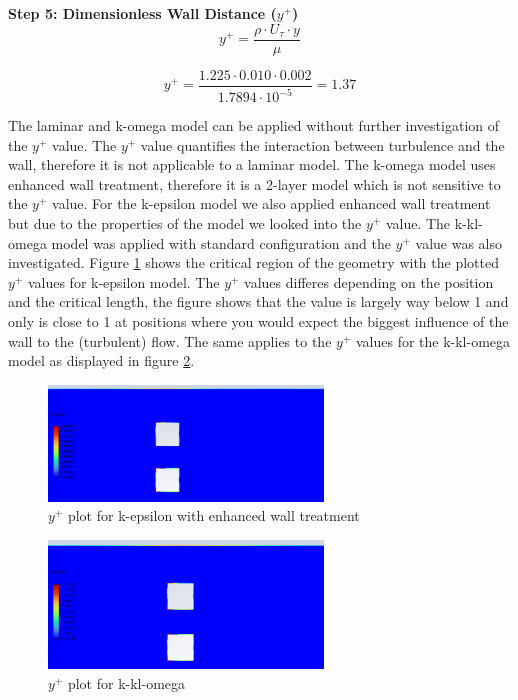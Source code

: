\textbf{Step 5: Dimensionless Wall Distance (\( y^+ \))}
\begin{equation}
y^+ = \frac{\rho \cdot U_\tau \cdot y}{\mu}
\end{equation}

\begin{equation}
y^+ = \frac{1.225 \cdot 0.010 \cdot 0.002}{1.7894 \cdot 10^{-5}} = 1.37
\end{equation}



The laminar and k-omega model can be applied without further investigation of the $y^+$ value. The $y^+$ value quantifies the interaction between turbulence and the wall, therefore it is not applicable to a laminar model. The k-omega model uses enhanced wall treatment, therefore it is a 2-layer model which is not sensitive to the $y^+$ value.
For the k-epsilon model we also applied enhanced wall treatment but due to the properties of the model we looked into the $y^+$ value. The k-kl-omega model was applied with standard configuration and the $y^+$ value was also investigated. Figure \ref{fig:k_epsilon_enhanced_y_plus} shows the critical region of the geometry with the plotted $y^+$ values for k-epsilon model. The $y^+$ values differes depending on the position and the critical length, the figure shows that the value is largely way below 1 and only is close to 1 at positions where you would expect the biggest influence of the wall to the (turbulent) flow.
The same applies to the $y^+$ values for the k-kl-omega model as displayed in figure \ref{fig:k_kl_omega_y_plus}.

\begin{figure}[h]   
    \centering
    \includegraphics[width=0.65\textwidth]{img/y_plus_k_epsilon_enhanced_wt.png}
    \caption{$y^+$ plot for k-epsilon with enhanced wall treatment}
    \label{fig:k_epsilon_enhanced_y_plus}
\end{figure}

\begin{figure}[h]   
    \centering
    \includegraphics[width=0.65\textwidth]{img/y_plus_k_kl_omega_detail_inf5.png}
    \caption{$y^+$ plot for k-kl-omega}
    \label{fig:k_kl_omega_y_plus}
\end{figure}

